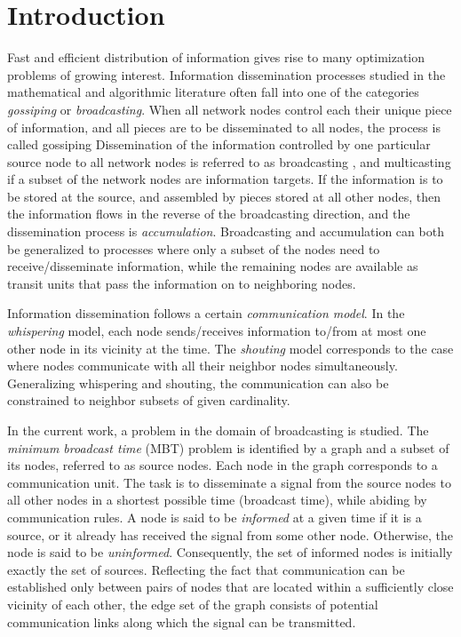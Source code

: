 \section{Introduction}
\label{intro}
Fast and efficient distribution of information gives rise to many optimization problems of growing interest.
Information dissemination processes studied in the mathematical and algorithmic literature \cite{fraigniaud94, harutyunyan13, hedetniemi88, hromkovic96}
often fall into one of the categories \emph{gossiping} or \emph{broadcasting}.
When all network nodes control each their unique piece of information, and all pieces are to be disseminated to all nodes,
the process is called gossiping \cite{bermond98, bermond95}
Dissemination of the information controlled by one particular source node to all network nodes is referred to as broadcasting \cite{mcgarvey16, ravi94},
and multicasting \cite{barnoy00} if a subset of the network nodes are information targets.
If the information is to be stored at the source, and assembled by pieces stored at all other nodes, then the information flows in the reverse of the broadcasting direction,
and the dissemination process is \emph{accumulation}.
Broadcasting and accumulation can both be generalized to processes where only a subset of the nodes need to receive/disseminate information,
while the remaining nodes are available as transit units that pass the information on to neighboring nodes.

Information dissemination follows a certain \emph{communication model}.
In the \emph{whispering} model, each node sends/receives information to/from at most one other node in its vicinity at the time.
The \emph{shouting} model corresponds to the case where nodes communicate with all their neighbor nodes simultaneously.
Generalizing whispering and shouting, the communication can also be constrained to neighbor subsets of given cardinality.

In the current work, a problem in the domain of broadcasting is studied.
The \emph{minimum broadcast time} (MBT) problem is identified by a graph and a subset of its nodes,
referred to as source nodes.
Each node in the graph corresponds to a communication unit.
The task is to disseminate a signal from the source nodes to all other nodes in a shortest possible time (broadcast time), while abiding by communication rules.
A node is said to be \emph{informed} at a given time if it is a source, or it already has received the signal from some other node.
Otherwise, the node is said to be \emph{uninformed}.
Consequently, the set of informed nodes is initially exactly the set of sources.
Reflecting the fact that communication can be established only between pairs of nodes that are located within a sufficiently close vicinity of each other,
the edge set of the graph consists of potential communication links along which the signal can be transmitted.


